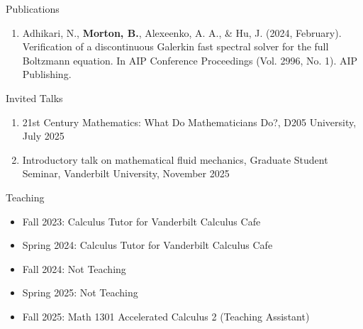 \documentclass{CV} %
\begin{document}
\begin{rSection}{Publications}

\begin{enumerate}
    \item Adhikari, N., \textbf{Morton, B.}, Alexeenko, A. A., \& Hu, J. (2024, February). Verification of a discontinuous Galerkin fast spectral solver for the full Boltzmann equation. In AIP Conference Proceedings (Vol. 2996, No. 1). AIP Publishing.
\end{enumerate}

\end{rSection}


\begin{rSection}{Invited Talks}
    \begin{enumerate}
        \item 21st Century Mathematics:  What Do Mathematicians Do?, D205 University, July 2025
        \item Introductory talk on mathematical fluid mechanics, Graduate Student Seminar, Vanderbilt University, November 2025
    \end{enumerate}
\end{rSection}


\begin{rSection}{Teaching}
    \begin{itemize}
        \item Fall 2023: Calculus Tutor for Vanderbilt Calculus Cafe
        \item Spring 2024: Calculus Tutor for Vanderbilt Calculus Cafe
        \item Fall 2024: Not Teaching 
        \item Spring 2025: Not Teaching 
        \item Fall 2025: Math 1301 Accelerated Calculus 2 (Teaching Assistant)
    \end{itemize}
\end{rSection}


\end{document}
